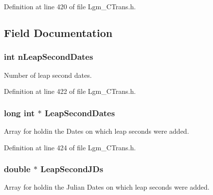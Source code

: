 Definition at line 420 of file Lgm\_\-CTrans.h.

\subsection{Field Documentation}
\hypertarget{struct_lgm___leap_seconds_a3dde6cfdaff24850ad827b07a0730d7}{
\subsubsection[{nLeapSecondDates}]{\setlength{\rightskip}{0pt plus 5cm}int {\bf nLeapSecondDates}}}
\label{struct_lgm___leap_seconds_a3dde6cfdaff24850ad827b07a0730d7}


Number of leap second dates. 



Definition at line 422 of file Lgm\_\-CTrans.h.\hypertarget{struct_lgm___leap_seconds_4369aebda8e4aea18cba6dc90d539dc7}{
\subsubsection[{LeapSecondDates}]{\setlength{\rightskip}{0pt plus 5cm}long int $\ast$ {\bf LeapSecondDates}}}
\label{struct_lgm___leap_seconds_4369aebda8e4aea18cba6dc90d539dc7}


Array for holdin the Dates on which leap seconds were added. 



Definition at line 424 of file Lgm\_\-CTrans.h.\hypertarget{struct_lgm___leap_seconds_e2bc1c43d2bc9b92f9558233db952daf}{
\subsubsection[{LeapSecondJDs}]{\setlength{\rightskip}{0pt plus 5cm}double $\ast$ {\bf LeapSecondJDs}}}
\label{struct_lgm___leap_seconds_e2bc1c43d2bc9b92f9558233db952daf}


Array for holdin the Julian Dates on which leap seconds were added. 



